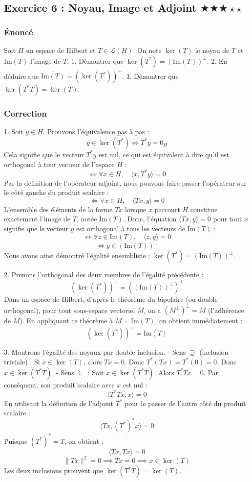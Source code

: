 \documentclass[11pt,a4paper]{article}
\begin{document}
\subsection*{Exercice 6 : Noyau, Image et Adjoint $\bigstar\bigstar\bigstar\star\star$}
\subsubsection*{Énoncé}
Soit $H$ un espace de Hilbert et $T \in \mathcal{L}(H)$.
On note $\ker(T)$ le noyau de $T$ et $\text{Im}(T)$ l'image de $T$.
1. Démontrer que $\ker(T^*) = (\text{Im}(T))^\perp$.
2. En déduire que $\overline{\text{Im}(T)} = (\ker(T^*))^\perp$.
3. Démontrer que $\ker(T^* T) = \ker(T)$.

\subsubsection*{Correction}
1. Soit $y \in H$. Prouvons l'équivalence pas à pas :
$$ y \in \ker(T^*) \iff T^*y = 0_H $$
Cela signifie que le vecteur $T^*y$ est nul, ce qui est équivalent à dire qu'il est orthogonal à tout vecteur de l'espace $H$ :
$$ \iff \forall x \in H, \quad \langle x, T^*y \rangle = 0 $$
Par la définition de l'opérateur adjoint, nous pouvons faire passer l'opérateur sur le côté gauche du produit scalaire :
$$ \iff \forall x \in H, \quad \langle Tx, y \rangle = 0 $$
L'ensemble des éléments de la forme $Tx$ lorsque $x$ parcourt $H$ constitue exactement l'image de $T$, notée $\text{Im}(T)$.
Donc, l'équation $\langle Tx, y \rangle = 0$ pour tout $x$ signifie que le vecteur $y$ est orthogonal à tous les vecteurs de $\text{Im}(T)$ :
$$ \iff \forall z \in \text{Im}(T), \quad \langle z, y \rangle = 0 $$
$$ \iff y \in (\text{Im}(T))^\perp $$
Nous avons ainsi démontré l'égalité ensembliste : $\ker(T^*) = (\text{Im}(T))^\perp$.

2. Prenons l'orthogonal des deux membres de l'égalité précédente :
$$ (\ker(T^*))^\perp = ((\text{Im}(T))^\perp)^\perp $$
Dans un espace de Hilbert, d'après le théorème du bipolaire (ou double orthogonal), pour tout sous-espace vectoriel $M$, on a $(M^\perp)^\perp = \overline{M}$ (l'adhérence de $M$).
En appliquant ce théorème à $M = \text{Im}(T)$, on obtient immédiatement :
$$ (\ker(T^*))^\perp = \overline{\text{Im}(T)} $$

3. Montrons l'égalité des noyaux par double inclusion.
- Sens $\supseteq$ (inclusion triviale) :
Si $x \in \ker(T)$, alors $Tx = 0$. Donc $T^*(Tx) = T^*(0) = 0$. Donc $x \in \ker(T^* T)$.
- Sens $\subseteq$ :
Soit $x \in \ker(T^* T)$. Alors $T^* T x = 0$.
Par conséquent, son produit scalaire avec $x$ est nul :
$$ \langle T^* T x, x \rangle = 0 $$
En utilisant la définition de l'adjoint $T^*$ pour le passer de l'autre côté du produit scalaire :
$$ \langle Tx, (T^*)^* x \rangle = 0 $$
Puisque $(T^*)^* = T$, on obtient :
$$ \langle Tx, Tx \rangle = 0 $$
$$ \|Tx\|^2 = 0 \implies Tx = 0 \implies x \in \ker(T) $$
Les deux inclusions prouvent que $\ker(T^* T) = \ker(T)$.
\end{document}
